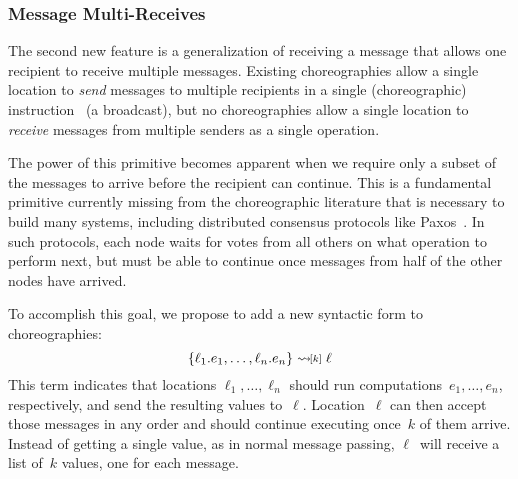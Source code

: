 \fi

\subsubsection{Message Multi-Receives}
\label{sec:multi-receive}

The second new feature is a generalization of receiving a message that allows one recipient to receive multiple messages.
Existing choreographies allow a single location to \emph{send} messages to multiple recipients in a single (choreographic) instruction~\citep{BatesK+25,SamuelsonHC25} (a broadcast),
but no choreographies allow a single location to \emph{receive} messages from multiple senders as a single operation.

The power of this primitive becomes apparent when we require only a subset of the messages to arrive before the recipient can continue.
This is a fundamental primitive currently missing from the choreographic literature that is necessary to build many systems,
including distributed consensus protocols like Paxos~\citep{Lamport98}.
In such protocols, each node waits for votes from all others on what operation to perform next,
but must be able to continue once messages from half of the other nodes have arrived.

To accomplish this goal, we propose to add a new syntactic form to choreographies:
\[
  \{\ell_1.e_1, \dotsc, \ell_n.e_n\} \multircv[k] \ell
\]
This term indicates that locations $\ell_1, \dotsc, \ell_n$ should run computations~$e_1, \dotsc, e_n$, respectively, and send the resulting values to~$\ell$.
Location~$\ell$ can then accept those messages in any order and should continue executing once~$k$ of them arrive.
Instead of getting a single value, as in normal message passing, $\ell$~will receive a list of~$k$ values, one for each message.


